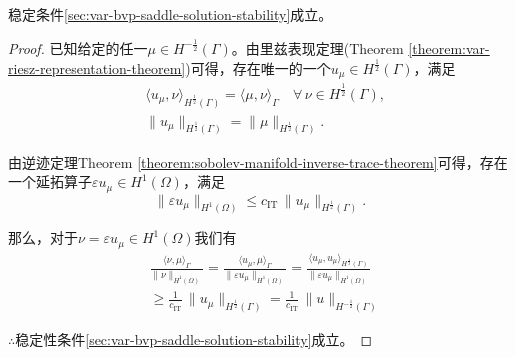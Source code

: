 \begin{lemma}[鞍点变分形式狄利克雷边界值问题解的稳定条件]
  \label{lemma:var-bvp-saddle-solution-stability}
  稳定条件\eqref{sec:var-bvp-saddle-solution-stability}成立。
\end{lemma}
\begin{proof}
  已知给定的任一$\mu \in H^{-\frac{1}{2}}(\Gamma)$。由里兹表现定理(Theorem \ref{theorem:var-riesz-representation-theorem})可得，存在唯一的一个$u_{\mu} \in H^{\frac{1}{2}}(\Gamma)$，满足
  \begin{equation*}
    \begin{split}
      & \langle u_{\mu}, \nu \rangle_{H^{\frac{1}{2}}(\Gamma)} = \langle \mu, \nu \rangle_{\Gamma} \quad \forall \, \nu \in H^{\frac{1}{2}}(\Gamma), \\
      & \big\| u_{\mu} \big\|_{H^{\frac{1}{2}}(\Gamma)} = \big\| \mu \big\|_{H^{\frac{1}{2}}(\Gamma)}.
    \end{split}
  \end{equation*}

  由逆迹定理Theorem \ref{theorem:sobolev-manifold-inverse-trace-theorem}可得，存在一个延拓算子$\varepsilon u_{\mu} \in H^{1}(\Omega)$，满足
  \begin{equation*}
    \big\| \varepsilon u_{\mu} \big\|_{H^{1}(\Omega)} \le c_{\text{IT}} \, \big\| u_{\mu} \big\|_{H^{\frac{1}{2}}(\Gamma)}.
  \end{equation*}

  那么，对于$\nu = \varepsilon u_{\mu} \in H^{1}(\Omega)$我们有
  \begin{equation*}
    \begin{split}
      & \frac{
      \langle \nu, \mu \rangle_{\Gamma}
      }{
      \big\| \nu \big\|_{H^{1}(\Omega)}
      }
      =
      \frac{
      \langle u_{\mu}, \mu \rangle_{\Gamma}
      }{
      \big\| \varepsilon u_{\mu} \big\|_{H^{1}(\Omega)}
      }
      =
      \frac{
      \langle u_{\mu}, u_{\mu} \rangle_{H^{\frac{1}{2}}(\Gamma)}
      }{\big\| \varepsilon u_{\mu} \big\|_{H^{1}(\Omega)}}\\
      & \ge \frac{1}{c_{\text{IT}}} \,
      \big\| u_{\mu} \big\|_{H^{\frac{1}{2}}(\Gamma)}
      = \frac{1}{c_{\text{IT}}} \,
      \big\| u \big\|_{H^{- \frac{1}{2}}(\Gamma)}
    \end{split}
  \end{equation*}

  $\therefore$稳定性条件\eqref{sec:var-bvp-saddle-solution-stability}成立。
\end{proof}

